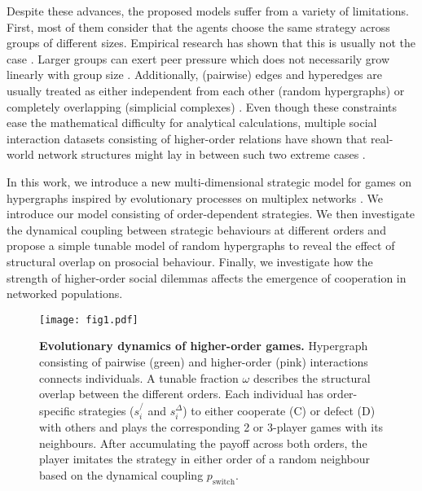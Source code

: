 \documentclass[a4paper,pre,reqno,superscriptaddress,twocolumn, floatfix]{revtex4}
\begin{document}
Despite these advances, the proposed models suffer from a variety of limitations. First, most of them consider that the agents choose the same strategy across groups of different sizes. Empirical research has shown that this is usually not the case \cite{krause_social_2007, funato_model_2011, cantor_primer_2020, ogino_group-level_2023, quan_cooperation_2024}. Larger groups can exert peer pressure which does not necessarily grow linearly with group size \cite{capraro_group_2015, pena_group_2018, pereda_group_2019}. Additionally,  (pairwise) edges and hyperedges are usually treated as either independent from each other (random hypergraphs) or completely overlapping (simplicial complexes) \cite{battiston_networks_2020, zhang_higher-order_2023, malizia2025hyperedge}. Even though these constraints ease the mathematical difficulty for analytical calculations, multiple social interaction datasets consisting of higher-order relations have shown that real-world network structures might lay in between such two extreme cases \cite{zhang_higher-order_2023, gallo_higher-order_2024, iacopini_temporal_2024, ma_optimal_2024}.



In this work, we introduce a new multi-dimensional strategic model for games on hypergraphs inspired by evolutionary processes on multiplex networks \cite{battiston_determinants_2017}. We introduce our model consisting of order-dependent strategies. We then investigate the dynamical coupling between strategic behaviours at different orders and propose a simple tunable model of random hypergraphs to reveal the effect of structural overlap on prosocial behaviour. Finally, we investigate how the strength of higher-order social dilemmas affects the emergence of cooperation in networked populations.






\begin{figure*}[!ht]
    \centering
    \texttt{[image: fig1.pdf]}
    \caption{\textbf{Evolutionary dynamics of higher-order games.} Hypergraph consisting of pairwise (green) and higher-order (pink) interactions connects individuals. A tunable fraction $\omega$ describes the structural overlap between the different orders. Each individual has order-specific strategies ($s_i^/$ and $s_i^{\Delta}$) to either cooperate (C) or defect (D) with others and plays the corresponding 2 or 3-player games with its neighbours. After accumulating the payoff across both orders, the player imitates the strategy in either order of a random neighbour based on the dynamical coupling $p_{\text{switch}}$.}
    \label{fig:illustration}
\end{figure*}
\end{document}
